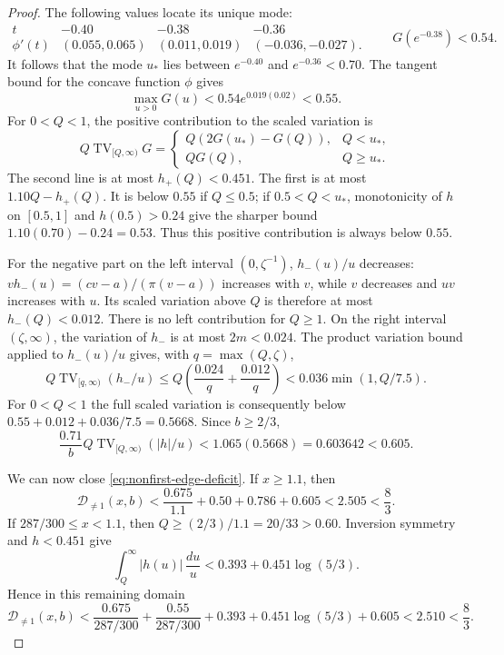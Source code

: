 \begin{proof}
The following values locate its unique mode:
\[
 \begin{array}{c|ccc}
 t&-0.40&-0.38&-0.36\\ \hline
 \phi'(t)&(0.055,0.065)&(0.011,0.019)&(-0.036,-0.027).
 \end{array}
 \qquad G(e^{-0.38})<0.54.
\]
It follows that the mode \(u_*\) lies between \(e^{-0.40}\) and
\(e^{-0.36}<0.70\). The tangent bound for the concave function \(\phi\) gives
\[
 \max_{u>0}G(u)<0.54e^{0.019(0.02)}<0.55.
\]
For \(0<Q<1\), the positive contribution to the scaled variation is
\[
 Q\operatorname{TV}_{[Q,\infty)}G
 =\begin{cases}
 Q(2G(u_*)-G(Q)),&Q<u_*,\\
 QG(Q),&Q\ge u_*.
 \end{cases}
\]
The second line is at most \(h_+(Q)<0.451\). The first is at most
\(1.10Q-h_+(Q)\). It is below \(0.55\) if \(Q\le0.5\); if
\(0.5<Q<u_*\), monotonicity of \(h\) on \([0.5,1]\) and \(h(0.5)>0.24\) give the sharper bound \(1.10(0.70)-0.24=0.53\). Thus this positive contribution is always below \(0.55\).

For the negative part on the left interval \((0,\zeta^{-1})\),
\(h_-(u)/u\) decreases: \(v h_-(u)=(cv-a)/(\pi(v-a))\) increases with \(v\), while \(v\) decreases and \(uv\) increases with \(u\). Its scaled variation above \(Q\) is therefore at most \(h_-(Q)<0.012\). There is no left contribution for \(Q\ge1\). On the right interval \((\zeta,\infty)\), the variation of \(h_-\) is at most \(2m<0.024\). The product variation bound applied to \(h_-(u)/u\) gives, with \(q=\max(Q,\zeta)\),
\[
 Q\operatorname{TV}_{[q,\infty)}(h_-/u)
 \le Q\left(\frac{0.024}{q}+\frac{0.012}{q}\right)
 <0.036\min(1,Q/7.5).
\]
For \(0<Q<1\) the full scaled variation is consequently below
\(0.55+0.012+0.036/7.5=0.5668\). Since \(b\ge2/3\),
\begin{equation}\label{eq:nonfirst-variation-number}
 \frac{0.71}{b}Q\operatorname{TV}_{[Q,\infty)}(|h|/u)
 <1.065(0.5668)=0.603642<0.605.
\end{equation}

We can now close \eqref{eq:nonfirst-edge-deficit}. If \(x\ge1.1\), then
\[
 \mathcal D_{\ne1}(x,b)
 <\frac{0.675}{1.1}+0.50+0.786+0.605
 <2.505<\frac83.
\]
If \(287/300\le x<1.1\), then
\(Q\ge(2/3)/1.1=20/33>0.60\). Inversion symmetry and \(h<0.451\) give
\[
 \int_Q^\infty |h(u)|\,\frac{du}{u}
 <0.393+0.451\log(5/3).
\]
Hence in this remaining domain
\[
 \mathcal D_{\ne1}(x,b)
 <\frac{0.675}{287/300}+\frac{0.55}{287/300}
   +0.393+0.451\log(5/3)+0.605
 <2.510<\frac83.
\]


\end{proof}
